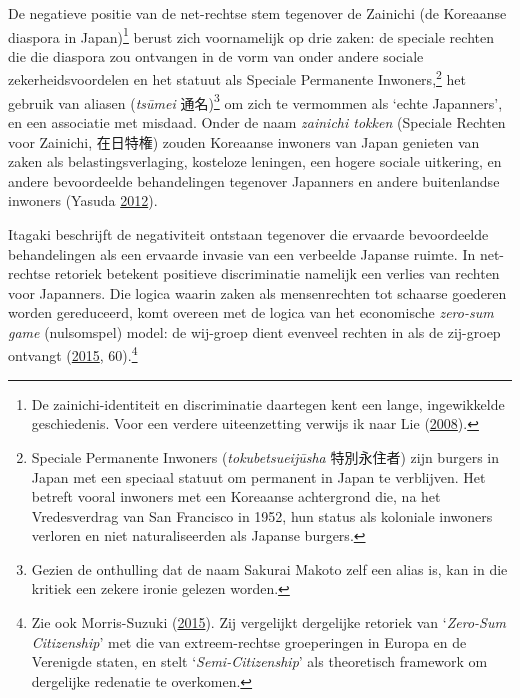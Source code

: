 \documentclass[10.5pt,dutch,]{article}
\begin{document}
De negatieve positie van de net-rechtse stem tegenover de Zainichi (de
Koreaanse diaspora in Japan)\footnote{De zainichi-identiteit en
  discriminatie daartegen kent een lange, ingewikkelde geschiedenis.
  Voor een verdere uiteenzetting verwijs ik naar Lie  (\protect\hyperlink{ref-lieux5fzainichiux5f2008}{2008}).} berust zich
voornamelijk op drie zaken: de speciale rechten die die diaspora zou
ontvangen in de vorm van onder andere sociale zekerheidsvoordelen en het
statuut als Speciale Permanente Inwoners,\footnote{Speciale Permanente
  Inwoners (\emph{tokubetsueijūsha} 特別永住者) zijn burgers in Japan
  met een speciaal statuut om permanent in Japan te verblijven. Het
  betreft vooral inwoners met een Koreaanse achtergrond die, na het
  Vredesverdrag van San Francisco in 1952, hun status als koloniale
  inwoners verloren en niet naturaliseerden als Japanse burgers.} het
gebruik van aliasen (\emph{tsūmei} 通名)\footnote{Gezien de onthulling
  dat de naam Sakurai Makoto zelf een alias is, kan in die kritiek een
  zekere ironie gelezen worden.} om zich te vermommen als `echte
Japanners', en een associatie met misdaad. Onder de naam \emph{zainichi
tokken} (Speciale Rechten voor Zainichi, 在日特権) zouden Koreaanse
inwoners van Japan genieten van zaken als belastingsverlaging, kosteloze
leningen, een hogere sociale uitkering, en andere bevoordeelde
behandelingen tegenover Japanners en andere buitenlandse inwoners
(Yasuda \protect\hyperlink{ref-yasudaux5fnettoux5f2012}{2012}).

Itagaki beschrijft de negativiteit ontstaan tegenover die ervaarde
bevoordeelde behandelingen als een ervaarde invasie van een verbeelde
Japanse ruimte. In net-rechtse retoriek betekent positieve discriminatie
namelijk een verlies van rechten voor Japanners. Die logica waarin zaken
als mensenrechten tot schaarse goederen worden gereduceerd, komt overeen
met de logica van het economische \emph{zero-sum game} (nulsomspel)
model: de wij-groep dient evenveel rechten in als de zij-groep ontvangt
(\protect\hyperlink{ref-itagakiux5fanatomyux5f2015}{2015},
60).\footnote{Zie ook Morris-Suzuki
  (\protect\hyperlink{ref-morris-suzukiux5fbeyondux5f2015}{2015}). Zij
  vergelijkt dergelijke retoriek van `\emph{Zero-Sum Citizenship}' met
  die van extreem-rechtse groeperingen in Europa en de Verenigde staten,
  en stelt `\emph{Semi-Citizenship}' als theoretisch framework om
  dergelijke redenatie te overkomen.}
\end{document}
